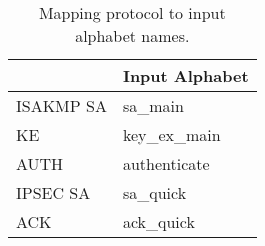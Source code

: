 \begin{table}[h]
	\centering
	\begin{tabular}{|l|l|}
		\hline
		\rowcolor[HTML]{DAE8FC} 
		\hline
		\multicolumn{1}{|l|}{\cellcolor[HTML]{DAE8FC}\textbf{Protocol}} & \multicolumn{1}{l|}{\cellcolor[HTML]{DAE8FC}\textbf{Input Alphabet}} \\ \hline
		ISAKMP SA                                                       & sa\_main                                                             \\
		KE                                                              & key\_ex\_main                                                        \\
		AUTH                                                            & authenticate                                                         \\
		IPSEC SA                                                        & sa\_quick                                                            \\
		ACK                                                             & ack\_quick                                                           \\ \hline
	\end{tabular}
	\caption{Mapping protocol to input alphabet names.}
	\label{tab:map_prot_ia}
\end{table}

